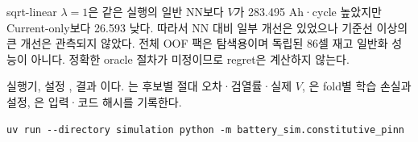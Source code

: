 sqrt-linear $\lambda=1$은 같은 실행의 일반 NN보다 $V$가 283.495 Ah·cycle 높았지만 Current-only보다 26.593 낮다. 따라서 NN 대비 일부 개선은 있었으나 기준선 이상의 큰 개선은 관측되지 않았다. 전체 OOF 팩은 탐색용이며 독립된 86셀 재고 일반화 성능이 아니다. 정확한 oracle 절차가 미정이므로 regret은 계산하지 않는다.

 실행기, 설정 , 결과 이다. 는 후보별 절대 오차·검열률·실제 $V$, 은 fold별 학습 손실과 설정, 은 입력·코드 해시를 기록한다.
\begin{Verbatim}[fontsize=\small]
uv run --directory simulation python -m battery_sim.constitutive_pinn
\end{Verbatim}
